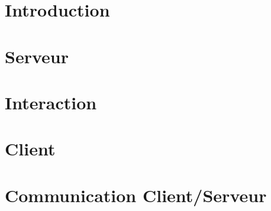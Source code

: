 \documentclass[asi]{documentLong}
\begin{document}
\couverture{}

\informationsGenerales{}

\tableofcontents{}

\newpage

\chapter{Introduction}


\chapter{Serveur}


\chapter{Interaction}
\label{chap:interaction}


\chapter{Client}


\chapter{Communication Client/Serveur}


\pageQuatriemeCouverture{}
\end{document}
